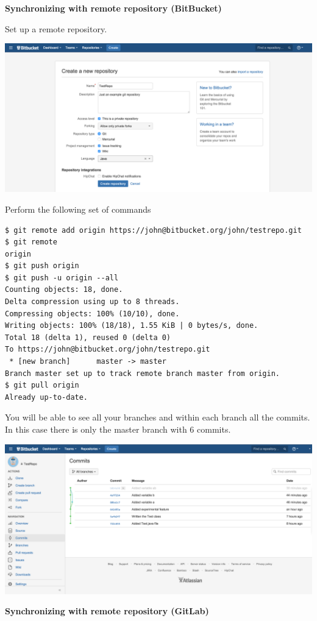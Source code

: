 \documentclass{article}
\begin{document}
\textbf{Synchronizing with remote repository (BitBucket)}

Set up a remote repository.
\begin{center}
\includegraphics[scale=0.33]{figures/s1.png}
\end{center}

Perform the following set of commands
\begin{lstlisting}
$ git remote add origin https://john@bitbucket.org/john/testrepo.git
$ git remote
origin
$ git push origin
$ git push -u origin --all
Counting objects: 18, done.
Delta compression using up to 8 threads.
Compressing objects: 100% (10/10), done.
Writing objects: 100% (18/18), 1.55 KiB | 0 bytes/s, done.
Total 18 (delta 1), reused 0 (delta 0)
To https://john@bitbucket.org/john/testrepo.git
 * [new branch]      master -> master
Branch master set up to track remote branch master from origin.
$ git pull origin
Already up-to-date.
\end{lstlisting}

You will be able to see all your branches and within each branch all
the commits. In this case there is only the master branch with 6 commits.
\begin{center}
\includegraphics[scale=0.33]{figures/s2.png}
\end{center}
\newpage 
\textbf{Synchronizing with remote repository (GitLab)}
\end{document}
